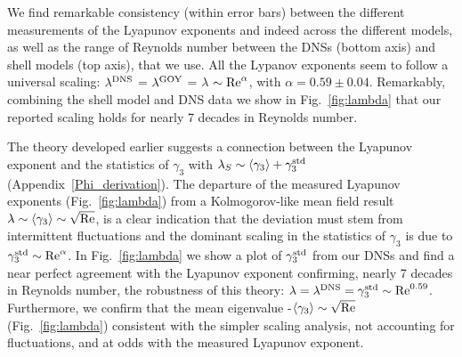 \documentclass[amsmath,amssymb,amsbsy,pre,twocolumn,tightenlines,superscriptaddress,floatfix]{revtex4-2}
\begin{document}
We find remarkable consistency (within error bars) between the different
measurements of the Lyapunov exponents and indeed across the different models,
as well as the range of Reynolds number between the DNSs (bottom axis) and
shell models (top axis), that we use. All the Lypanov exponents seem to follow
a universal scaling: $\lambda^{\rm DNS}$ = $\lambda^{\rm GOY}$ = $\lambda$
$\sim {\rm Re}^{\alpha}$, with $\alpha = 0.59 \pm 0.04$. Remarkably, combining the
shell model and DNS data we show in Fig.~\ref{fig:lambda} that our reported scaling
holds for nearly 7 decades in Reynolds number.

The theory developed earlier suggests a connection between the Lyapunov exponent and the statistics of
$\gamma_3$ with $\lambda_S \sim \langle \gamma_3 \rangle + \gamma_3^{\rm std}$ (Appendix~\ref{Phi_derivation}).
The departure of the measured Lyapunov exponents (Fig.~\ref{fig:lambda}) from a Kolmogorov-like mean field result $\lambda \sim \langle \gamma_3 \rangle  \sim \sqrt{{\rm Re}}$, is a clear indication that the
deviation must stem from intermittent fluctuations and the dominant scaling in the statistics of $\gamma_3$ is
due to $\gamma_3^{\rm std} \sim {\rm Re}^\alpha$. In Fig.~\ref{fig:lambda} we show a plot of $\gamma_3^{\rm std}$ from our DNSs and find a near perfect agreement with the Lyapunov exponent confirming, nearly 7 decades in Reynolds number, the
robustness of this theory: $\lambda = \lambda^{\rm DNS} = \gamma_3^{\rm std} \sim {\rm Re}^{0.59}$. Furthermore,
we confirm that the mean eigenvalue -$\langle \gamma_3 \rangle \sim \sqrt{{\rm Re}}$ (Fig.~\ref{fig:lambda}) consistent with the simpler scaling analysis, not accounting
for fluctuations, and at odds with the measured Lyapunov exponent.
\end{document}
